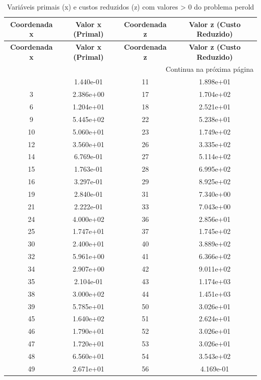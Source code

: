 \documentclass[12pt]{article}
\begin{document}
\begin{longtable}{@{}cccc@{}}
\caption{Variáveis primais (x) e custos reduzidos (z) com valores > 0 do problema perold} \\
\toprule
\textbf{Coordenada x} & \textbf{Valor x (Primal)} & \textbf{Coordenada z} & \textbf{Valor z (Custo Reduzido)} \\
\midrule
\endfirsthead

\toprule
\textbf{Coordenada x} & \textbf{Valor x (Primal)} & \textbf{Coordenada z} & \textbf{Valor z (Custo Reduzido)} \\
\midrule
\endhead

\midrule \multicolumn{4}{r}{{Continua na próxima página}} \\ \midrule
\endfoot

\bottomrule
\endlastfoot
1 & 1.440e-01 & 11 & 1.898e+01 \\
3 & 2.386e+00 & 17 & 1.704e+02 \\
6 & 1.204e+01 & 18 & 2.521e+01 \\
9 & 5.445e+02 & 22 & 5.238e+01 \\
10 & 5.060e+01 & 23 & 1.749e+02 \\
12 & 3.560e+01 & 26 & 3.335e+02 \\
14 & 6.769e-01 & 27 & 5.114e+02 \\
15 & 1.763e-01 & 28 & 6.995e+02 \\
16 & 3.297e-01 & 29 & 8.925e+02 \\
19 & 2.840e-01 & 31 & 7.340e+00 \\
21 & 2.222e-01 & 33 & 7.043e+00 \\
24 & 4.000e+02 & 36 & 2.856e+01 \\
25 & 1.747e+01 & 37 & 1.745e+02 \\
30 & 2.400e+01 & 40 & 3.889e+02 \\
32 & 5.961e+00 & 41 & 6.366e+02 \\
34 & 2.907e+00 & 42 & 9.011e+02 \\
35 & 2.104e-01 & 43 & 1.174e+03 \\
38 & 3.000e+02 & 44 & 1.451e+03 \\
39 & 5.785e+01 & 50 & 3.026e+01 \\
45 & 1.640e+02 & 51 & 2.624e+01 \\
46 & 1.790e+01 & 52 & 3.026e+01 \\
47 & 1.720e+01 & 53 & 3.026e+01 \\
48 & 6.560e+01 & 54 & 3.543e+02 \\
49 & 2.671e+01 & 56 & 4.169e-01 \\

\end{longtable}
\end{document}
